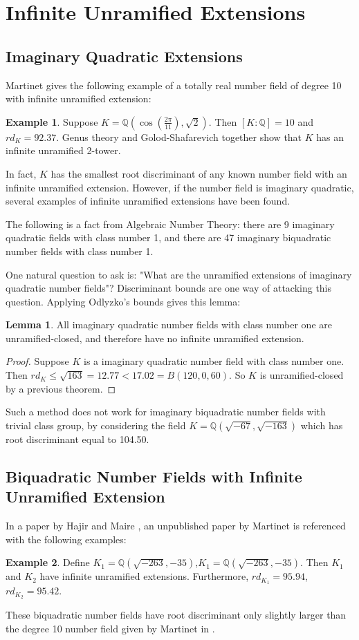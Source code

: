 \documentclass[12pt]{extarticle}
\newcommand{\Q}{\mathbb{Q}}
\newcommand{\<}{\langle}
\renewcommand{\>}{\rangle}
\theoremstyle{definition}
\newtheorem{example}{Example}
\newtheorem{lemma}{Lemma}
\begin{document}
\section{Infinite Unramified Extensions}
\subsection{Imaginary Quadratic Extensions}
Martinet \cite{MART1978} gives the following example of a totally real number field of degree 10 with infinite unramified extension:
\begin{example}
\label{ex:martinet}
Suppose $K = \Q\left(\cos(\frac{2\pi}{11}),\sqrt{2}\right)$. Then $[K:\Q]=10$ and $rd_K = 92.37$. Genus theory and Golod-Shafarevich together show that $K$ has an infinite unramified 2-tower.
\end{example}
 In fact, $K$ has the smallest root discriminant of any known number field with an infinite unramified extension. 
However, if the number field is imaginary quadratic, several examples of infinite unramified extensions have been found. \par
The following is a fact from Algebraic Number Theory: there are 9 imaginary quadratic fields with class number 1, and there are 47 imaginary biquadratic number fields with class number 1. \par One natural question to ask is: "What are the unramified extensions of imaginary quadratic number fields"? Discriminant bounds are one way of attacking this question. Applying Odlyzko's bounds gives this lemma:
\begin{lemma}
All imaginary quadratic number fields with class number one are unramified-closed, and therefore have no infinite unramified extension.  
\end{lemma}
\begin{proof}
Suppose $K$ is a imaginary quadratic number field with class number one. Then $rd_K \leq \sqrt{163} = 12.77 < 17.02 = B(120,0,60)$. So $K$ is unramified-closed by a previous theorem. 
\end{proof}
Such a method does not work for imaginary biquadratic number fields with trivial class group, by considering the field $K=\Q(\sqrt{-67},\sqrt{-163})$ which has root discriminant equal to 104.50. 

\subsection{ Biquadratic Number Fields with Infinite Unramified Extension}
In a paper by Hajir and Maire \cite{HAJIR2002415}, an unpublished paper by Martinet is referenced with the following examples:
\begin{example}
Define $K_1 = \Q\left( \sqrt{-263},{-35}\right)$,$K_1 = \Q\left( \sqrt{-263},{-35}\right)$. Then $K_1$ and $K_2$ have infinite unramified extensions. Furthermore, $rd_{K_1} = 95.94$, $rd_{K_2} = 95.42$.
\end{example}
These biquadratic number fields have root discriminant only slightly larger than the degree 10 number field given by Martinet in . \par
\end{document}
